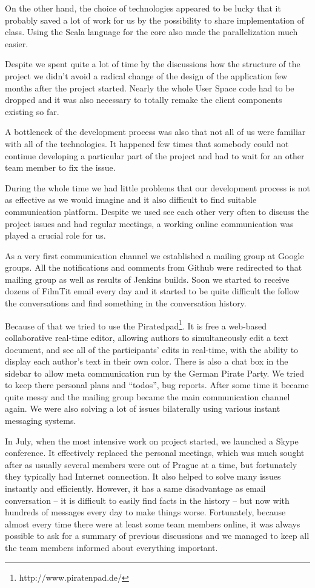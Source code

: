 {On the other hand, the choice of technologies appeared to be lucky that it probably saved a lot of work for us by the possibility to share implementation of class. Using the Scala language for the core also made the parallelization much easier.

Despite we spent quite a lot of time by the discussions how the structure of the project we didn't avoid a radical change of the design of the application few months after the project started. Nearly the whole User Space code had to be dropped and it was also necessary to totally remake the client components existing so far.

A bottleneck of the development process was also that not all of us were familiar with all of the technologies. It happened few times that somebody could not continue developing a particular part of the project and had to wait for an other team member to fix the issue.

During the whole time we had little problems that our development process is not as effective as we would imagine and it also difficult to find suitable communication platform. Despite we used see each other very often to discuss the project issues and had regular meetings, a working online communication was played a crucial role for us.

As a very first communication channel we established a mailing group at Google groups. All the notifications and comments from Github were redirected to that mailing group as well as results of Jenkins builds. Soon we started to receive dozens of FilmTit email every day and it started to be quite difficult the follow the conversations and find something in the conversation history.

Because of that we tried to use the Piratedpad\footnote{http://www.piratenpad.de/}. It is free a web-based collaborative real-time editor, allowing authors to simultaneously edit a text document, and see all of the participants' edits in real-time, with the ability to display each author's text in their own color. There is also a chat box in the sidebar to allow meta communication run by the German Pirate Party. We tried to keep there personal plans and ``todos'', bug reports. After some time it became quite messy and the mailing group became the main communication channel again. We were also solving a lot of issues bilaterally using various instant messaging systems.

In July, when the most intensive work on project started, we launched a Skype conference. It effectively replaced the personal meetings, which was much sought after as usually several members were out of Prague at a time, but fortunately they typically had Internet connection.
It also helped to solve many issues instantly and efficiently.
However, it has a same disadvantage as email conversation -- it is difficult to easily find facts in the history -- but now with hundreds of messages every day to make things worse.
Fortunately, because almost every time there were at least some team members online, it was always possible to ask for a summary of previous discussions and we managed to keep all the team members informed about everything important.

}
